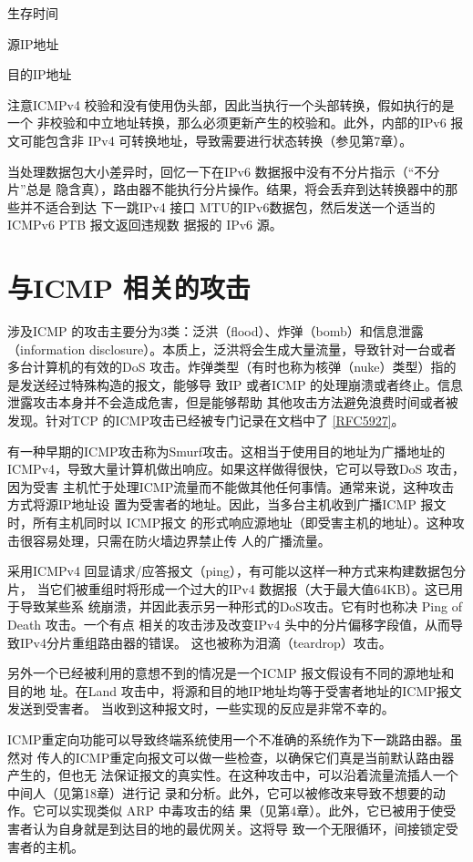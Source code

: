 生存时间

源IP地址

目的IP地址

注意ICMPv4 校验和没有使用伪头部，因此当执行一个头部转换，假如执行的是一个
非校验和中立地址转换，那么必须更新产生的校验和。此外，内部的IPv6 报文可能包含非
IPv4 可转换地址，导致需要进行状态转换（参见第7章）。

当处理数据包大小差异时，回忆一下在IPv6 数据报中没有不分片指示（“不分片”总是
隐含真），路由器不能执行分片操作。结果，将会丢弃到达转换器中的那些并不适合到达
下一跳IPv4 接口 MTU的IPv6数据包，然后发送一个适当的ICMPv6 PTB 报文返回违规数
据报的 IPv6 源。

\section{与ICMP 相关的攻击}

涉及ICMP 的攻击主要分为3类：泛洪（flood）、炸弹（bomb）和信息泄露 （information
disclosure）。本质上，泛洪将会生成大量流量，导致针对一台或者多台计算机的有效的DoS
攻击。炸弹类型（有时也称为核弹（nuke）类型）指的是发送经过特殊构造的报文，能够导
致IP 或者ICMP 的处理崩溃或者终止。信息泄露攻击本身并不会造成危害，但是能够帮助
其他攻击方法避免浪费时间或者被发现。针对TCP 的ICMP攻击已经被专门记录在文档中了
\href{https://www.rfc-editor.org/rfc/rfc5927}{[RFC5927]}。

有一种早期的ICMP攻击称为Smurf攻击。这相当于使用目的地址为广播地址的
ICMPv4，导致大量计算机做出响应。如果这样做得很快，它可以导致DoS 攻击，因为受害
主机忙于处理ICMP流量而不能做其他任何事情。通常来说，这种攻击方式将源IP地址设
置为受害者的地址。因此，当多台主机收到广播ICMP 报文时，所有主机同时以 ICMP报文
的形式响应源地址（即受害主机的地址）。这种攻击很容易处理，只需在防火墙边界禁止传
人的广播流量。

采用ICMPv4 回显请求/应答报文（ping），有可能以这样一种方式来构建数据包分片，
当它们被重组时将形成一个过大的IPv4 数据报（大于最大值64KB）。这已用于导致某些系
统崩溃，并因此表示另一种形式的DoS攻击。它有时也称决 Ping of Death 攻击。一个有点
相关的攻击涉及改变IPv4 头中的分片偏移字段值，从而导致IPv4分片重组路由器的错误。
这也被称为泪滴（teardrop）攻击。

另外一个已经被利用的意想不到的情况是一个ICMP 报文假设有不同的源地址和目的地
址。在Land 攻击中，将源和目的地IP地址均等于受害者地址的ICMP报文发送到受害者。
当收到这种报文时，一些实现的反应是非常不幸的。

ICMP重定向功能可以导致终端系统使用一个不准确的系统作为下一跳路由器。虽然对
传人的ICMP重定向报文可以做一些检查，以确保它们真是当前默认路由器产生的，但也无
法保证报文的真实性。在这种攻击中，可以沿着流量流插人一个中间人（见第18章）进行记
录和分析。此外，它可以被修改来导致不想要的动作。它可以实现类似 ARP 中毒攻击的结
果（见第4章）。此外，它已被用于使受害者认为自身就是到达目的地的最优网关。这将导
致一个无限循环，间接锁定受害者的主机。

